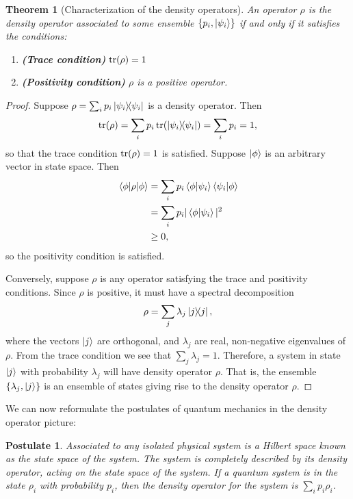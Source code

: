 \documentclass{article}
\newtheorem{theorem}{Theorem}
\numberwithin{theorem}{section}
\numberwithin{corollary}{section}
\newtheorem{postulate}{Postulate}
\numberwithin{postulate}{section}
\begin{document}
\setcounter{theorem}{4}
\begin{theorem}[Characterization of the density operators]
  An operator $\rho$ is the density operator associated to some ensemble
  $\{p_i, \ket{\psi_i}\}$ if and only if it satisfies the conditions:
  \begin{enumerate}[(1)]
    \item \textbf{(Trace condition)} $\tr(\rho) = 1$
    \item \textbf{(Positivity condition)} $\rho$ is a positive operator.
  \end{enumerate}
\end{theorem}
\begin{proof}
  Suppose $\rho = \sum_i p_i\op{\psi_i}$ is a density operator. Then \[
    \tr(\rho) = \sum_i p_i\tr(\op{\psi_i}) = \sum_i p_i = 1,
  \] so that the trace condition $\tr(\rho) = 1$ is satisfied. Suppose
  $\ket{\phi}$ is an arbitrary vector in state space. Then
  \begin{align*}
    \ev{\rho}{\phi}
    &= \sum_i p_i\ip{\phi}{\psi_i}\ip{\psi_i}{\phi} \\
    &= \sum_i p_i|\ip{\phi}{\psi_i}|^2 \\
    &\geq 0,
  \end{align*}
  so the positivity condition is satisfied.

  Conversely, suppose $\rho$ is any operator satisfying the trace and
  positivity conditions. Since $\rho$ is positive, it must have a spectral
  decomposition \[
    \rho = \sum_j \lambda_j\op{j},
  \] where the vectors $\ket{j}$ are orthogonal, and $\lambda_j$ are real,
  non-negative eigenvalues of $\rho$. From the trace condition we see that
  $\sum_j \lambda_j = 1$. Therefore, a system in state $\ket{j}$ with
  probability $\lambda_j$ will have density operator $\rho$. That is, the
  ensemble $\{\lambda_j, \ket{j}\}$ is an ensemble of states giving rise to the
  density operator $\rho$.
\end{proof}

We can now reformulate the postulates of quantum mechanics in the density
operator picture:

\setcounter{postulate}{0}
\begin{postulate}
  Associated to any isolated physical system is a Hilbert space known as the
  \emph{state space} of the system. The system is completely described by its
  \emph{density operator}, acting on the state space of the system. If a
  quantum system is in the state $\rho_i$ with probability $p_i$, then the
  density operator for the system is $\sum_i p_i\rho_i$.
\end{postulate}
\end{document}

